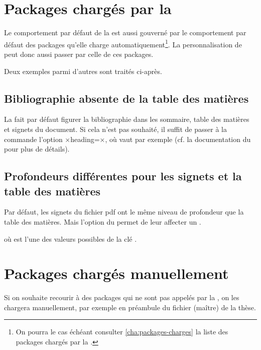 \section{Packages chargés par la \yatcl}

Le comportement par défaut de la \yatcl{} est aussi gouverné par le
comportement par défaut des packages qu'elle charge
automatiquement\footnote{ On pourra le cas échéant consulter
  \vref{cha:packages-charges} la liste des packages chargés par la \yatcl{}.}.
La personnalisation de \yat{} peut donc aussi passer par celle de ces packages.

Deux exemples parmi d'autres sont traités ci-après.

\subsection{Bibliographie absente de la table des matières}

La \yatcl{} fait par défaut figurer la bibliographie dans les sommaire, table
des matières et signets du document. Si cela n'est pas souhaité, il suffit de
passer à la commande  l'option
×heading=×, où  vaut par exemple
 (cf. la documentation du  pour plus
de détails).

\subsection{Profondeurs différentes pour les signets et la table des matières}

Par défaut, les signets du fichier \acrshort{pdf} ont le même niveau de
profondeur que la table des matières. Mais l'option 
du  permet de leur affecter un .
\begin{preamblecode}[title=Par exemple dans le \File{\configurationfile}]
\end{preamblecode}
où  est l'une des valeurs possibles de la clé
.

\section{Packages chargés manuellement}
\label{sec:options-de-classes}
Si on souhaite recourir à des packages qui ne sont pas appelés par la \yatcl{},
on les chargera manuellement, par exemple en préambule du fichier (maître) de
la thèse.
%
\iffalse
\fi

